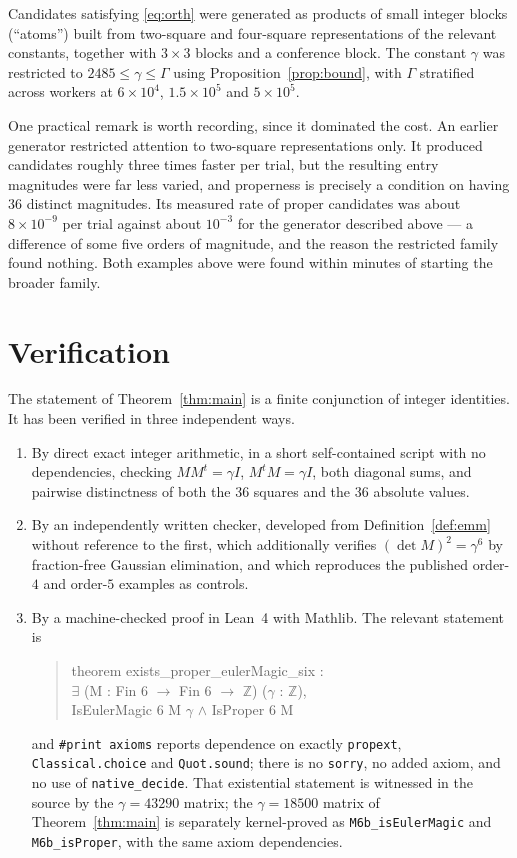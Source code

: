 \documentclass[11pt]{amsart}
\theoremstyle{plain}
\theoremstyle{definition}
\newcommand{\Z}{\mathbb{Z}}
\begin{document}
Candidates satisfying \eqref{eq:orth} were generated as products of small
integer blocks (``atoms'') built from two-square and four-square representations
of the relevant constants, together with $3\times3$ blocks and a conference
block. The constant $\gamma$ was restricted to $2485\leq\gamma\leq\Gamma$ using
Proposition~\ref{prop:bound}, with $\Gamma$ stratified across workers at
$6\times10^4$, $1.5\times10^5$ and $5\times10^5$.

One practical remark is worth recording, since it dominated the cost. An earlier
generator restricted attention to two-square representations only. It produced
candidates roughly three times faster per trial, but the resulting entry
magnitudes were far less varied, and properness is precisely a condition on
having $36$ distinct magnitudes. Its measured rate of proper candidates was about
$8\times10^{-9}$ per trial against about $10^{-3}$ for the generator described
above --- a difference of some five orders of magnitude, and the reason the
restricted family found nothing. Both examples above were found within minutes of
starting the broader family.

\section{Verification}\label{sec:verif}

The statement of Theorem~\ref{thm:main} is a finite conjunction of integer
identities. It has been verified in three independent ways.

\begin{enumerate}
\item By direct exact integer arithmetic, in a short self-contained script with
no dependencies, checking $MM^{t}=\gamma I$, $M^{t}M=\gamma I$, both diagonal
sums, and pairwise distinctness of both the $36$ squares and the $36$ absolute
values.
\item By an independently written checker, developed from
Definition~\ref{def:emm} without reference to the first, which additionally
verifies $(\det M)^2=\gamma^6$ by fraction-free Gaussian elimination, and which
reproduces the published order-$4$ and order-$5$ examples as controls.
\item By a machine-checked proof in Lean~4 with Mathlib. The relevant statement
is
\begin{quote}\ttfamily
theorem exists\_proper\_eulerMagic\_six :\\
\phantom{xx}$\exists$ (M : Fin 6 $\to$ Fin 6 $\to$ $\Z$) ($\gamma$ : $\Z$),\\
\phantom{xxxx}IsEulerMagic 6 M $\gamma$ $\wedge$ IsProper 6 M
\end{quote}
and \verb|#print axioms| reports dependence on exactly \verb|propext|,
\verb|Classical.choice| and \verb|Quot.sound|; there is no \verb|sorry|, no
added axiom, and no use of \verb|native_decide|. That existential statement is
witnessed in the source by the $\gamma=43290$ matrix; the $\gamma=18500$ matrix
of Theorem~\ref{thm:main} is separately kernel-proved as
\verb|M6b_isEulerMagic| and \verb|M6b_isProper|, with the same axiom
dependencies.
\end{enumerate}
\end{document}
